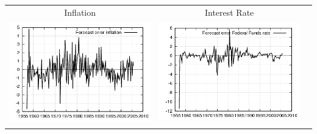\documentclass{beamer}
\begin{document}
{\begin{center}
\begin{tabular}{ccc}
  \small{Inflation} & \small{Interest Rate} & \\
  \includegraphics[scale=0.23]{plots2/cap_initre_Forecast_error_inflation.png} & \includegraphics[scale=0.23]{plots2/cap_initre_Forecast_error_Federal_Funds_rate.png} & \\ \\
  \end{tabular}
  \end{center}
}
\end{document}
